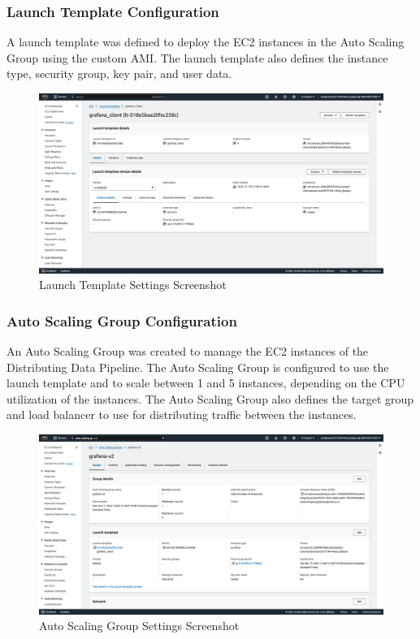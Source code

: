 \documentclass[12pt,oneside]{book} %
\begin{document}
\newpage
\subsubsection{Launch Template Configuration}
A launch template was defined to deploy the EC2 instances in the Auto Scaling
Group using the custom AMI. The launch template also defines the instance type,
security group, key pair, and user data.
\begin{figure}[H]
    \centering
    \includegraphics[width=1\linewidth]{images/launch-template.png}
    \caption{Launch Template Settings Screenshot}
\end{figure}

\newpage
\subsubsection{Auto Scaling Group Configuration}
An Auto Scaling Group was created to manage the EC2 instances of the
Distributing Data Pipeline. The Auto Scaling Group is configured to use the
launch template and to scale between 1 and 5 instances, depending on the CPU
utilization of the instances. The Auto Scaling Group also defines the target
group and load balancer to use for distributing traffic between the instances.
\begin{figure}[H]
    \centering
    \includegraphics[width=1\linewidth]{images/auto-scaling-group.png}
    \caption{Auto Scaling Group Settings Screenshot}
\end{figure}
\end{document}
